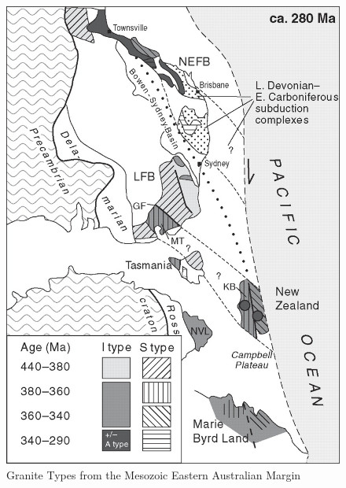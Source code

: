 \documentclass[a4paper]{article}
\begin{document}
\begin{figure}[H]
\centering
\includegraphics[width=1\textwidth]{Granite_Types_from_the_Eastern_Australian_Margin.jpg}
\caption{\label{fig:GraniteTypes}Granite Types from the Mesozoic Eastern Australian Margin}
\end{figure}
\end{document}
